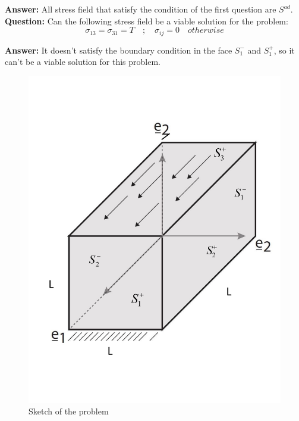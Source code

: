 \documentclass[letter,12pt]{article}
\begin{document}
 \noindent \textbf{Answer:} All stress field that satisfy the condition of the first question are $S^{ad}$.
 \\
 
 \noindent \textbf{Question:} Can the following stress field be a viable solution for the problem:
 \begin{equation}
 \sigma_{13}=\sigma_{31}=T \quad ; \quad \sigma_{ij} =0 \quad otherwise
 \end{equation} 
 
 \noindent \textbf{Answer:}
 It doesn't satisfy the boundary condition in the face $S_{1}^{-}$ and $S_{1}^{+}$, so it can't be a viable solution for this problem.

%
\begin{figure}[!h]
	\centering
	\includegraphics[width=0.5\linewidth]{./volume}
	\caption{Sketch of the problem}
\end{figure}
%


 
 
 


 
\end{document}
